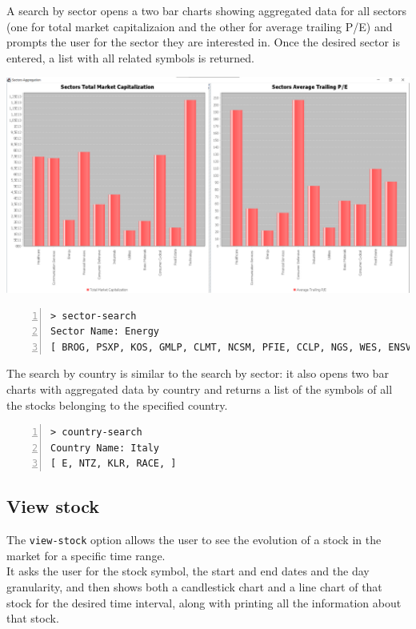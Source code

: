 A search by sector opens a two bar charts showing aggregated data for all sectors (one for total market capitalizaion and the other for average trailing P/E) and prompts the user for the sector they are interested in.
Once the desired sector is entered, a list with all related symbols is returned.

\hfill \break
{\centering
\includegraphics[scale=0.28]{img/user_manual/sector_aggregation.png}\\
}

\begin{lstlisting}[basicstyle=\footnotesize\ttfamily,language={},numbers=left,
numberstyle=\footnotesize,numbersep=8pt,frame=single]
> sector-search
Sector Name: Energy
[ BROG, PSXP, KOS, GMLP, CLMT, NCSM, PFIE, CCLP, NGS, WES, ENSV, FTSI, AXAS, EC, DEN, TTI, NBLX, E, GTE, PSX, PED, NNA, VVV, PVL, AR, HP, CEQP, MUR, DK, RTLR, LEU, NGL, NFG, PTEN, MMLP, PAGP, NESR, NR, PBFX, TRMD, BKR, NOG, ... ]
\end{lstlisting}

The search by country is similar to the search by sector: it also opens two bar charts with aggregated data by country and returns a list of the symbols of all the stocks belonging to the specified country.
\begin{lstlisting}[basicstyle=\footnotesize,language={},numbers=left,
numberstyle=\footnotesize,numbersep=8pt,frame=single]
> country-search
Country Name: Italy
[ E, NTZ, KLR, RACE, ]
\end{lstlisting}
\subsection{View stock}

The \texttt{view-stock} option allows the user to see the evolution of a stock in the market for a specific time range.\\
It asks the user for the stock symbol, the start and end dates and the day granularity, and then shows both a candlestick chart and a line chart of that stock for the desired time interval, along with printing all the information about that stock.

